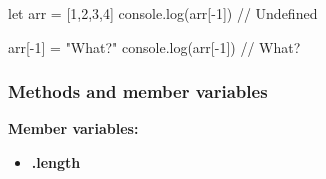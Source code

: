 \documentclass{report}
\begin{document}
    \bigbreak \noindent 
    \begin{jscode}
        let arr = [1,2,3,4]
        console.log(arr[-1]) // Undefined

        arr[-1] = "What?"
        console.log(arr[-1]) // What?
    \end{jscode}

    \bigbreak \noindent 
    \subsubsection{Methods and member variables}
    \bigbreak \noindent 
    \textbf{Member variables:}
    \begin{itemize}
        \item \textbf{.length}
    \end{itemize}
\end{document}
